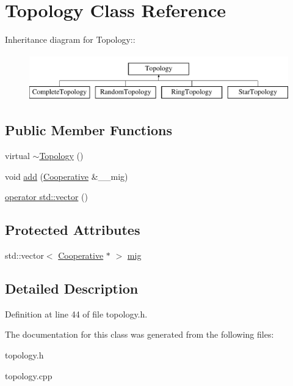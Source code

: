 \hypertarget{classTopology}{
\section{Topology Class Reference}
\label{classTopology}
}
Inheritance diagram for Topology::\begin{figure}[H]
\begin{center}
\leavevmode
\includegraphics[height=2cm]{classTopology}
\end{center}
\end{figure}
\subsection*{Public Member Functions}
\begin{CompactItemize}
\item 
\hypertarget{classTopology_3e447669757c8311c7f6f8edc705abf2}{
virtual \hyperlink{classTopology_3e447669757c8311c7f6f8edc705abf2}{$\sim$Topology} ()}
\label{classTopology_3e447669757c8311c7f6f8edc705abf2}

\item 
\hypertarget{classTopology_62bc46d8c20fdc71dad9e7c7a0d7aded}{
void \hyperlink{classTopology_62bc46d8c20fdc71dad9e7c7a0d7aded}{add} (\hyperlink{classCooperative}{Cooperative} \&\_\-\_\-mig)}
\label{classTopology_62bc46d8c20fdc71dad9e7c7a0d7aded}

\item 
\hypertarget{classTopology_5b48abce5d58230f944e95f3fe4f2727}{
\hyperlink{classTopology_5b48abce5d58230f944e95f3fe4f2727}{operator std::vector} ()}
\label{classTopology_5b48abce5d58230f944e95f3fe4f2727}

\end{CompactItemize}
\subsection*{Protected Attributes}
\begin{CompactItemize}
\item 
\hypertarget{classTopology_247a2faa8568b678f0b7b11e62c7812c}{
std::vector$<$ \hyperlink{classCooperative}{Cooperative} $\ast$ $>$ \hyperlink{classTopology_247a2faa8568b678f0b7b11e62c7812c}{mig}}
\label{classTopology_247a2faa8568b678f0b7b11e62c7812c}

\end{CompactItemize}


\subsection{Detailed Description}




Definition at line 44 of file topology.h.

The documentation for this class was generated from the following files:\begin{CompactItemize}
\item 
topology.h\item 
topology.cpp\end{CompactItemize}

